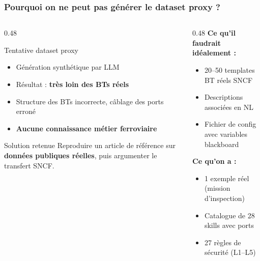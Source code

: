 \documentclass[aspectratio=169]{beamer}
\begin{document}

\begin{frame}
  \frametitle{Pourquoi on ne peut pas générer le dataset proxy ?}

  \begin{columns}
    \begin{column}{0.48\textwidth}
      \begin{alertblock}{Tentative dataset proxy}
        \begin{itemize}
          \item Génération synthétique par LLM
          \item Résultat : \textbf{très loin des BTs réels}
          \item Structure des BTs incorrecte, câblage des ports erroné
          \item \textbf{Aucune connaissance métier ferroviaire}
        \end{itemize}
      \end{alertblock}

      \vspace{0.4em}
      \begin{exampleblock}{Solution retenue}
        \small Reproduire un article de référence sur \textbf{données publiques réelles},
        puis argumenter le transfert SNCF.
      \end{exampleblock}
    \end{column}
    \begin{column}{0.48\textwidth}
      \textbf{Ce qu'il faudrait idéalement :}
      \begin{itemize}
        \item 20–50 templates BT réels SNCF
        \item Descriptions associées en NL
        \item Fichier de config avec variables blackboard
      \end{itemize}

      \vspace{0.5em}
      \textbf{Ce qu'on a :}
      \begin{itemize}
        \item 1 exemple réel (mission d'inspection)
        \item Catalogue de 28 skills avec ports
        \item 27 règles de sécurité (L1–L5)
      \end{itemize}
    \end{column}
  \end{columns}
\end{frame}
\end{document}
